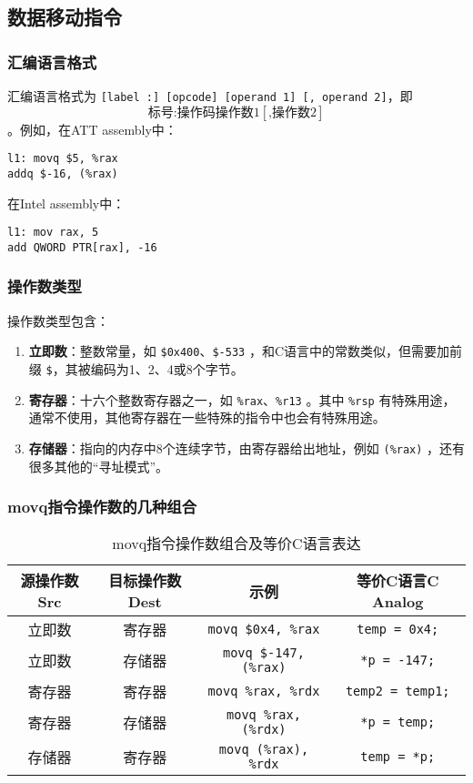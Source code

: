 \subsection{数据移动指令}
\subsubsection{汇编语言格式}
汇编语言格式为 \texttt{[label :] [opcode] [operand 1] [, operand 2]}，即\[\text{标号:} \text{操作码} \text{操作数}1 [\text{,操作数}2]\]。例如，在ATT assembly中：
\begin{verbatim}
l1: movq $5, %rax
addq $-16, (%rax)
\end{verbatim}
在Intel assembly中：
\begin{verbatim}
l1: mov rax, 5
add QWORD PTR[rax], -16
\end{verbatim}
\subsubsection{操作数类型}
操作数类型包含：
\begin{enumerate}[label=\arabic*.]
    \item \textbf{立即数}：整数常量，如 \texttt{\$0x400}、\texttt{\$-533} ，和C语言中的常数类似，但需要加前缀 \texttt{\$}，其被编码为1、2、4或8个字节。
    \item \textbf{寄存器}：十六个整数寄存器之一，如 \texttt{\%rax}、\texttt{\%r13} 。其中 \texttt{\%rsp} 有特殊用途，通常不使用，其他寄存器在一些特殊的指令中也会有特殊用途。
    \item \textbf{存储器}：指向的内存中8个连续字节，由寄存器给出地址，例如 \texttt{(\%rax)} ，还有很多其他的“寻址模式”。
\end{enumerate}
\subsubsection{movq指令操作数的几种组合}
\begin{table}[H]
    \captionsetup{skip=4pt}
    \centering
    \setlength{\arrayrulewidth}{1pt}
    \begin{tabular}{cccc}
        \hline
        源操作数Src & 目标操作数Dest & 示例                                     & 等价C语言C Analog                  \\
        \hline
        立即数     & 寄存器       & \texttt{movq \$0x4, \%rax}    & \texttt{temp = 0x4;}    \\
        立即数     & 存储器       & \texttt{movq \$-147, (\%rax)} & \texttt{*p = -147;}     \\
        寄存器     & 寄存器       & \texttt{movq \%rax, \%rdx}    & \texttt{temp2 = temp1;} \\
        寄存器     & 存储器       & \texttt{movq \%rax, (\%rdx)}  & \texttt{*p = temp;}     \\
        存储器     & 寄存器       & \texttt{movq (\%rax), \%rdx}  & \texttt{temp = *p;}     \\
        \hline
    \end{tabular}
    \caption{movq指令操作数组合及等价C语言表达}
\end{table}
